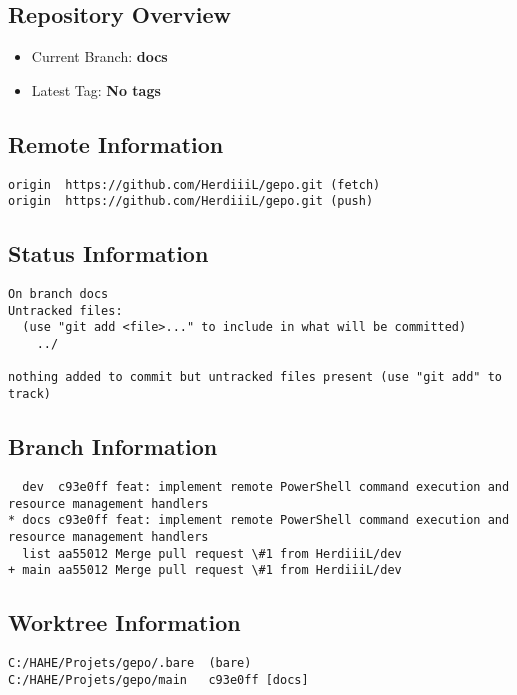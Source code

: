 \subsection*{Repository Overview}
\begin{itemize}
    \item Current Branch: \textbf{docs}
    \item Latest Tag: \textbf{No tags}
\end{itemize}

\subsection*{Remote Information}
\begin{verbatim}
origin	https://github.com/HerdiiiL/gepo.git (fetch)
origin	https://github.com/HerdiiiL/gepo.git (push)
\end{verbatim}

\subsection*{Status Information}
\begin{verbatim}
On branch docs
Untracked files:
  (use "git add <file>..." to include in what will be committed)
	../

nothing added to commit but untracked files present (use "git add" to track)
\end{verbatim}

\subsection*{Branch Information}
\begin{verbatim}
  dev  c93e0ff feat: implement remote PowerShell command execution and resource management handlers
* docs c93e0ff feat: implement remote PowerShell command execution and resource management handlers
  list aa55012 Merge pull request \#1 from HerdiiiL/dev
+ main aa55012 Merge pull request \#1 from HerdiiiL/dev
\end{verbatim}

\subsection*{Worktree Information}
\scriptsize
\begin{verbatim}
C:/HAHE/Projets/gepo/.bare  (bare)
C:/HAHE/Projets/gepo/main   c93e0ff [docs]
\end{verbatim}
\footnotesize

